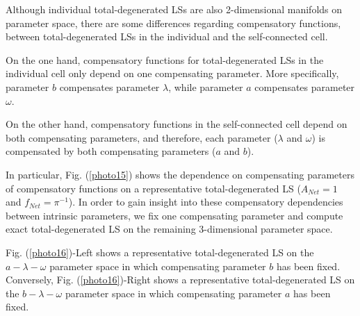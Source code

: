 Although individual total-degenerated LSs are also 2-dimensional manifolds on parameter space, there are some differences regarding compensatory functions, between total-degenerated LSs in the individual and the self-connected cell.

On the one hand, compensatory functions for total-degenerated LSs in the individual cell only depend on one compensating parameter. More specifically, parameter $b$ compensates parameter $\lambda$, while parameter $a$ compensates parameter $\omega$. 

On the other hand, compensatory functions in the self-connected cell depend on both compensating parameters, and therefore, each parameter ($\lambda$ and $\omega$) is compensated by both compensating parameters ($a$ and $b$).

In particular, Fig. (\ref{photo15}) shows the dependence on compensating parameters of compensatory functions on a representative total-degenerated LS ($A_{Net}=1$ and $f_{Net} = \pi^{-1}$). In order to gain insight into these compensatory dependencies between intrinsic parameters, we fix one compensating parameter and compute exact total-degenerated LS on the remaining 3-dimensional parameter space.

Fig. (\ref{photo16})-Left shows a representative total-degenerated LS on the $a-\lambda-\omega$ parameter space in which compensating parameter $b$ has been fixed. Conversely, Fig. (\ref{photo16})-Right shows a representative total-degenerated LS on the $b-\lambda-\omega$ parameter space in which compensating parameter $a$ has been fixed. 

